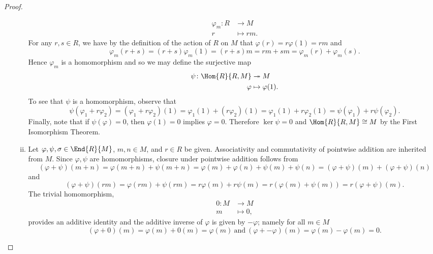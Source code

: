 \documentclass[10pt]{amsart}
\begin{document}
\begin{thm}
\begin{proof}
\begin{enumerate}[(a)]
\begin{enumerate}[(i)]
\begin{align*}
        \varphi_m \colon R &\rightarrow M\\
        r &\mapsto rm.
      \end{align*}
      For any $r, s \in R$, we have by the definition of the action of $R$ on $M$ that $\varphi(r) = r\varphi(1) = rm$ and
      $$\varphi_m(r + s) = (r + s)\varphi_m(1) = (r + s)m = rm + sm = \varphi_m(r) + \varphi_m(s).$$
      Hence $\varphi_m$ is a homomorphism and so we may define the surjective map 
      \begin{align*}
        \psi \colon \Hom{R}{R,M} &\twoheadrightarrow M\\
        \varphi &\mapsto \varphi(1).
      \end{align*}
      To see that $\psi$ is a homomorphism, observe that 
      $$\psi(\varphi_1 + r\varphi_2) = (\varphi_1 + r\varphi_2)(1) = \varphi_1(1) + (r\varphi_2)(1) = \varphi_1(1) + r\varphi_2(1) = \psi(\varphi_1) + r\psi(\varphi_2).$$
      Finally, note that if $\psi(\varphi) = 0$, then $\varphi(1) = 0$ implies $\varphi = 0$.
      Therefore $\ker\psi = 0$ and $\Hom{R}{R,M} \cong M$ by the First Isomorphism Theorem.
    \item
      Let $\varphi, \psi, \sigma \in \End{R}{M}$, $m, n \in M$, and $r \in R$ be given.
    Associativity and commutativity of pointwise addition are inherited from $M$.
    Since $\varphi, \psi$ are homomorphisms, closure under pointwise addition follows from 
    $$(\varphi + \psi)(m + n) = \varphi(m + n) + \psi(m + n) = \varphi(m) + \varphi(n) + \psi(m) + \psi(n) = (\varphi + \psi)(m) + (\varphi + \psi)(n)$$
    and 
    $$(\varphi + \psi)(rm) = \varphi(rm) + \psi(rm) = r\varphi(m) + r\psi(m) = r(\varphi(m) + \psi(m))= r(\varphi + \psi)(m).$$
    The trivial homomorphism,
    \begin{align*}
      0 \colon M & \rightarrow M\\
      m &\mapsto 0,
    \end{align*}
    provides an additive identity and the additive inverse of $\varphi$ is given by $-\varphi$; namely for all $m \in M$
    $$(\varphi + 0)(m) = \varphi(m) + 0(m) = \varphi(m)\ \text{and}\ (\varphi + -\varphi)(m) = \varphi(m) - \varphi(m) = 0.$$


\end{enumerate}
\end{enumerate}
\end{proof}
\end{thm}
\end{document}
